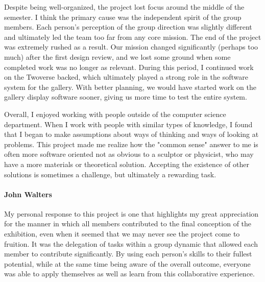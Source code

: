 Despite being well-organized, the project lost focus around the middle of the semester. I think the primary cause was the independent spirit of the group  members. Each person's perception of the group direction was slightly different and ultimately led the team too far from any core mission. The end of the project was extremely rushed as a result. Our mission changed significantly (perhaps too much) after the first design review, and we lost some ground when some completed work was no longer as relevant. During this period, I continued work on the Twoverse backed, which ultimately played a strong role in the software system for the gallery. With better planning, we would have started work on the gallery display software sooner, giving us more time to test the entire system. 

Overall, I enjoyed working with people outside of the computer science department. When I work with people with similar types of knowledge, I found that I began to make assumptions about ways of thinking and ways of looking at problems. This project made me realize how the "common sense" answer to me is often more software oriented not as obvious to a sculptor or physicist, who may have a more materials or theoretical solution. Accepting the existence of other solutions is sometimes a challenge, but ultimately a rewarding task.

\paragraph{John Walters}
My personal response to this project is one that highlights my great appreciation for the manner in which all members contributed to the final conception of the exhibition, even when it seemed that we may never see the project come to fruition. It was the delegation of tasks within a group dynamic that allowed each member to contribute significantly. By using each person’s skills to their fullest potential, while at the same time being aware of the overall outcome, everyone was able to apply themselves as well as learn from this collaborative experience.    

